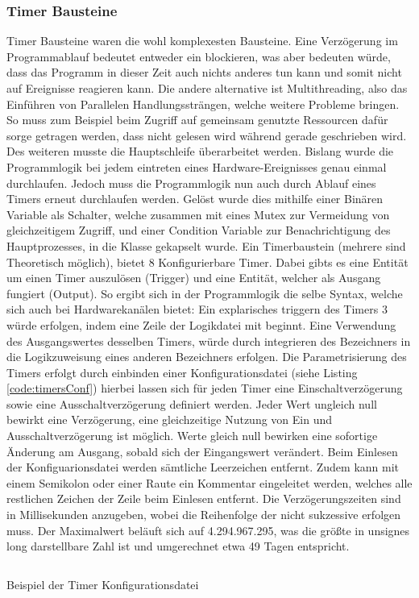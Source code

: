 \subsubsection{Timer Bausteine}\label{kap:ums:timerchannel}
Timer Bausteine waren die wohl komplexesten Bausteine. Eine Verzögerung im Programmablauf bedeutet entweder ein blockieren, was aber bedeuten würde, dass das Programm in dieser Zeit auch nichts anderes tun kann und somit nicht auf Ereignisse reagieren kann. Die andere alternative ist Multithreading, also das Einführen von Parallelen Handlungssträngen, welche weitere Probleme bringen. So muss zum Beispiel beim Zugriff auf gemeinsam genutzte Ressourcen dafür sorge getragen werden, dass nicht gelesen wird während gerade geschrieben wird. Des weiteren musste die Hauptschleife überarbeitet werden. Bislang wurde die Programmlogik bei jedem eintreten eines Hardware-Ereignisses genau einmal durchlaufen. Jedoch muss die Programmlogik nun auch durch Ablauf eines Timers erneut durchlaufen werden. Gelöst wurde dies mithilfe einer Binären Variable als Schalter, welche zusammen mit eines Mutex zur Vermeidung von gleichzeitigem Zugriff, und einer Condition Variable zur Benachrichtigung des Hauptprozesses, in die Klasse  gekapselt wurde. 
Ein Timerbaustein (mehrere sind Theoretisch möglich), bietet 8 Konfigurierbare Timer. Dabei gibts es eine Entität um einen Timer auszulösen  (Trigger) und eine Entität, welcher als Ausgang fungiert  (Output). So ergibt sich in der Programmlogik die selbe Syntax, welche sich auch bei Hardwarekanälen bietet: Ein explarisches triggern des Timers 3 würde erfolgen, indem eine Zeile der Logikdatei mit  beginnt. Eine Verwendung des Ausgangswertes desselben Timers, würde durch integrieren des Bezeichners \chphl{[To3]} in die Logikzuweisung eines anderen Bezeichners erfolgen. Die Parametrisierung des Timers erfolgt durch einbinden einer Konfigurationsdatei (siehe Listing \ref{code:timersConf}) hierbei lassen sich für jeden Timer eine Einschaltverzögerung sowie eine Ausschaltverzögerung definiert werden. Jeder Wert ungleich null bewirkt eine Verzögerung, eine gleichzeitige Nutzung von Ein und Ausschaltverzögerung ist möglich. Werte gleich null bewirken eine sofortige Änderung am Ausgang, sobald sich der Eingangswert verändert. Beim Einlesen der Konfiguarionsdatei werden sämtliche Leerzeichen entfernt. Zudem kann mit einem Semikolon \chphl{;} oder einer Raute \chphl{\#} ein Kommentar eingeleitet werden, welches alle restlichen Zeichen der Zeile beim Einlesen entfernt. Die Verzögerungszeiten sind in Millisekunden anzugeben, wobei die Reihenfolge der nicht sukzessive erfolgen muss. Der Maximalwert beläuft sich auf 4.294.967.295, was die größte in unsignes long darstellbare Zahl ist und umgerechnet etwa 49 Tagen entspricht. 
\begin{listing}[H]
	\inputminted[numbersep=1pt,fontsize=\scriptsize,frame=single, firstline=14,lastline=25]{c}{./code/timers.conf}
	\caption{Beispiel der Timer Konfigurationsdatei}
	\label{code:timersConf}
\end{listing}


